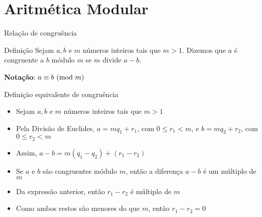 \section{Aritmética Modular}

\begin{frame}[fragile]{Relação de congruência}

    \begin{block}{Definição}
        Sejam $a, b$ e $m$ números inteiros tais que $m > 1$. Dizemos que $a$ é congruente a $b$
        módulo $m$ se $m$ divide $a - b$.

        \textbf{Notação}: $a\equiv b\ (\mbox{mod}\ m)$
    \end{block}

\end{frame}

\begin{frame}[fragile]{Definição equivalente de congruência}

    \begin{itemize}
        \item Sejam $a, b$ e $m$ números inteiros tais que $m > 1$

        \item Pela Divisão de Euclides, $a = mq_1 + r_1$, com $0\leq r_1 < m$, e $b = mq_2 + r_2$,
            com $0\leq r_2 < m$

        \item Assim, $a - b = m(q_1 - q_2) + (r_1 - r_2)$

        \item Se $a$ e $b$ são congruentes módulo $m$, então a diferença $a - b$ é um múltiplo
            de $m$

        \item Da expressão anterior, então $r_1 - r_2$ é múltiplo de $m$

        \item Como ambos restos são menores do que $m$, então $r_1 - r_2 = 0$ 
    
    \end{itemize}

\end{frame}

